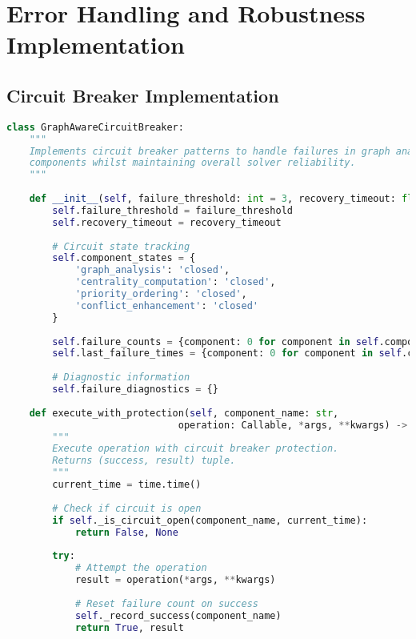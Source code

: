 \section{Error Handling and Robustness Implementation}
\label{appendix:error-handling}

\subsection{Circuit Breaker Implementation}
\label{appendix:circuit-breaker}

\begin{lstlisting}[language=Python, caption=Circuit Breaker Pattern for Reliable Operation]
class GraphAwareCircuitBreaker:
    """
    Implements circuit breaker patterns to handle failures in graph analysis 
    components whilst maintaining overall solver reliability.
    """
    
    def __init__(self, failure_threshold: int = 3, recovery_timeout: float = 60.0):
        self.failure_threshold = failure_threshold
        self.recovery_timeout = recovery_timeout
        
        # Circuit state tracking
        self.component_states = {
            'graph_analysis': 'closed',
            'centrality_computation': 'closed', 
            'priority_ordering': 'closed',
            'conflict_enhancement': 'closed'
        }
        
        self.failure_counts = {component: 0 for component in self.component_states}
        self.last_failure_times = {component: 0 for component in self.component_states}
        
        # Diagnostic information
        self.failure_diagnostics = {}
    
    def execute_with_protection(self, component_name: str, 
                              operation: Callable, *args, **kwargs) -> Tuple[bool, Any]:
        """
        Execute operation with circuit breaker protection.
        Returns (success, result) tuple.
        """
        current_time = time.time()
        
        # Check if circuit is open
        if self._is_circuit_open(component_name, current_time):
            return False, None
        
        try:
            # Attempt the operation
            result = operation(*args, **kwargs)
            
            # Reset failure count on success
            self._record_success(component_name)
            return True, result
            

\end{lstlisting}

